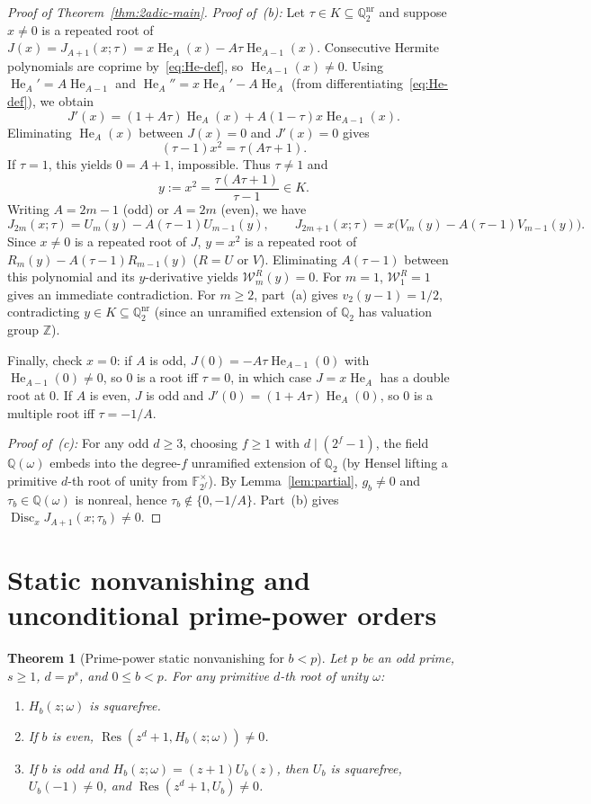 \documentclass[11pt,reqno]{amsart}
\numberwithin{equation}{section}
\newtheorem{theorem}{Theorem}[section]
\theoremstyle{definition}
\theoremstyle{remark}
\newcommand{\Q}{\mathbb{Q}}
\newcommand{\Z}{\mathbb{Z}}
\newcommand{\F}{\mathbb{F}}
\newcommand{\He}{\operatorname{He}}
\newcommand{\Disc}{\operatorname{Disc}}
\newcommand{\Res}{\operatorname{Res}}
\begin{document}
\begin{proof}[Proof of Theorem~\ref{thm:2adic-main}]
\smallskip
\noindent\emph{Proof of~(b):} Let $\tau\in K\subseteq\Q_2^{\mathrm{nr}}$ and suppose $x\neq 0$ is a repeated root of $J(x)=J_{A+1}(x;\tau)=x\He_A(x)-A\tau\He_{A-1}(x)$. Consecutive Hermite polynomials are coprime by~\eqref{eq:He-def}, so $\He_{A-1}(x)\neq 0$. Using $\He_A'=A\He_{A-1}$ and $\He_A''=x\He_A'-A\He_A$ (from differentiating~\eqref{eq:He-def}), we obtain
\[
J'(x) = (1+A\tau)\He_A(x) + A(1-\tau)x\He_{A-1}(x).
\]
Eliminating $\He_A(x)$ between $J(x)=0$ and $J'(x)=0$ gives
\[
(\tau-1)x^2 = \tau(A\tau+1).
\]
If $\tau=1$, this yields $0=A+1$, impossible. Thus $\tau\neq 1$ and
\[
y := x^2 = \frac{\tau(A\tau+1)}{\tau-1} \in K.
\]
Writing $A=2m-1$ (odd) or $A=2m$ (even), we have
\[
J_{2m}(x;\tau) = U_m(y) - A(\tau-1)U_{m-1}(y),\qquad
J_{2m+1}(x;\tau) = x\bigl(V_m(y) - A(\tau-1)V_{m-1}(y)\bigr).
\]
Since $x\neq 0$ is a repeated root of $J$, $y=x^2$ is a repeated root of $R_m(y)-A(\tau-1)R_{m-1}(y)$ ($R=U$ or $V$). Eliminating $A(\tau-1)$ between this polynomial and its $y$-derivative yields $\mathcal{W}_m^R(y)=0$. For $m=1$, $\mathcal{W}_1^R=1$ gives an immediate contradiction. For $m\ge 2$, part~(a) gives $v_2(y-1)=1/2$, contradicting $y\in K\subseteq\Q_2^{\mathrm{nr}}$ (since an unramified extension of $\Q_2$ has valuation group $\Z$).

Finally, check $x=0$: if $A$ is odd, $J(0)=-A\tau\He_{A-1}(0)$ with $\He_{A-1}(0)\neq 0$, so $0$ is a root iff $\tau=0$, in which case $J=x\He_A$ has a double root at $0$. If $A$ is even, $J$ is odd and $J'(0)=(1+A\tau)\He_A(0)$, so $0$ is a multiple root iff $\tau=-1/A$.

\smallskip
\noindent\emph{Proof of~(c):} For any odd $d\ge 3$, choosing $f\ge 1$ with $d\mid (2^f-1)$, the field $\Q(\omega)$ embeds into the degree-$f$ unramified extension of $\Q_2$ (by Hensel lifting a primitive $d$-th root of unity from $\F_{2^f}^\times$). By Lemma~\ref{lem:partial}, $g_b\neq 0$ and $\tau_b\in\Q(\omega)$ is nonreal, hence $\tau_b\notin\{0,-1/A\}$. Part~(b) gives $\Disc_x J_{A+1}(x;\tau_b)\neq 0$.
\end{proof}

\section{Static nonvanishing and unconditional prime-power orders}
\label{sec:prime-static}

\begin{theorem}[Prime-power static nonvanishing for $b<p$]
\label{thm:static}
Let $p$ be an odd prime, $s\ge 1$, $d=p^s$, and $0\le b<p$. For any primitive $d$-th root of unity $\omega$:
\begin{enumerate}[label=(\arabic*),leftmargin=2em]
\item $H_b(z;\omega)$ is squarefree.
\item If $b$ is even, $\Res(z^d+1,H_b(z;\omega))\neq 0$.
\item If $b$ is odd and $H_b(z;\omega)=(z+1)U_b(z)$, then $U_b$ is squarefree, $U_b(-1)\neq 0$, and $\Res(z^d+1,U_b)\neq 0$.
\end{enumerate}
\end{theorem}
\end{document}
